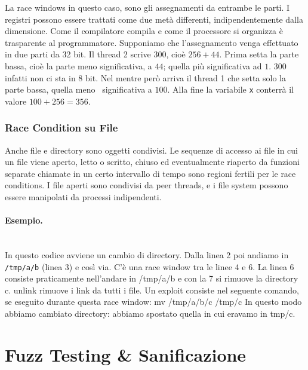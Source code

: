 La race windows in questo caso, sono gli assegnamenti da entrambe le parti.
I registri possono essere
trattati come due metà differenti, indipendentemente dalla dimensione.
Come il compilatore
compila e come il processore si organizza è trasparente al programmatore.
Supponiamo che l'assegnamento venga effettuato in due parti da 32 bit.
Il thread 2 scrive 300, cioè $256+44$. Prima setta la parte bassa,
cioè la parte meno
significativa, a $44$; quella più significativa ad $1$.
$300$ infatti non ci sta in 8 bit.
Nel mentre però arriva il thread 1 che setta solo la parte bassa, quella meno \
significativa a $100$.
Alla fine la variabile \verb|x| conterrà il valore $100+256=356$.

\subsubsection{Race Condition su File}

Anche file e directory sono oggetti condivisi.
Le sequenze di accesso ai file in cui un file viene aperto, letto o scritto,
chiuso ed
eventualmente riaperto da funzioni separate chiamate in un certo intervallo di
tempo sono
regioni fertili per le race conditions. I file aperti sono condivisi da
peer threads, e i file system
possono essere manipolati da processi indipendenti.

\paragraph{Esempio.}\ \\

In questo codice avviene un cambio di directory.
Dalla linea 2 poi andiamo in
\verb|/tmp/a/b| (linea 3) e così via.
C'è una race window tra le linee 4 e 6. La linea 6 consiste
praticamente nell'andare in /tmp/a/b e con la 7 si rimuove la
directory c. unlink rimuove i link da tutti i file.
Un exploit consiste nel seguente comando, se eseguito durante
questa race window: mv /tmp/a/b/c /tmp/c
In questo modo abbiamo cambiato directory: abbiamo spostato
quella in cui eravamo in tmp/c.

\section{Fuzz Testing \& Sanificazione}